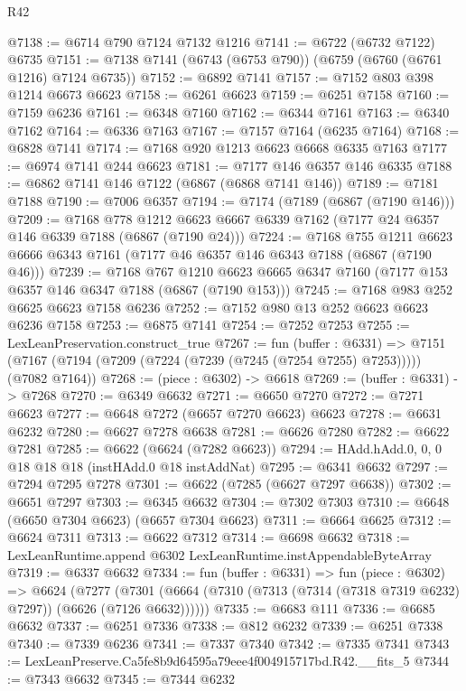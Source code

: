 \begin{lexlean}{R42}
\begin{coremodule}
{@7138 := @6714 @790 @7124 @7132 @1216
@7141 := @6722 (@6732 @7122) @6735
@7151 := @7138 @7141 (@6743 (@6753 @790)) (@6759 (@6760 (@6761 @1216) @7124 @6735))
@7152 := @6892 @7141
@7157 := @7152 @803 @398 @1214 @6673 @6623
@7158 := @6261 @6623
@7159 := @6251 @7158
@7160 := @7159 @6236
@7161 := @6348 @7160
@7162 := @6344 @7161
@7163 := @6340 @7162
@7164 := @6336 @7163
@7167 := @7157 @7164 (@6235 @7164)
@7168 := @6828 @7141
@7174 := @7168 @920 @1213 @6623 @6668 @6335 @7163
@7177 := @6974 @7141 @244 @6623
@7181 := @7177 @146 @6357 @146 @6335
@7188 := @6862 @7141 @146 @7122 (@6867 (@6868 @7141 @146))
@7189 := @7181 @7188
@7190 := @7006 @6357
@7194 := @7174 (@7189 (@6867 (@7190 @146)))
@7209 := @7168
    @778
    @1212
    @6623
    @6667
    @6339
    @7162
    (@7177 @24 @6357 @146 @6339 @7188 (@6867 (@7190 @24)))
@7224 := @7168
    @755
    @1211
    @6623
    @6666
    @6343
    @7161
    (@7177 @46 @6357 @146 @6343 @7188 (@6867 (@7190 @46)))
@7239 := @7168
    @767
    @1210
    @6623
    @6665
    @6347
    @7160
    (@7177 @153 @6357 @146 @6347 @7188 (@6867 (@7190 @153)))
@7245 := @7168 @983 @252 @6625 @6623 @7158 @6236
@7252 := @7152 @980 @13 @252 @6623 @6623 @6236 @7158
@7253 := @6875 @7141
@7254 := @7252 @7253
@7255 := LexLeanPreservation.construct_true
@7267 := fun (buffer : @6331) =>
  @7151 (@7167 (@7194 (@7209 (@7224 (@7239 (@7245 (@7254 @7255) @7253))))) (@7082 @7164))
@7268 := (piece : @6302) -> @6618
@7269 := (buffer : @6331) -> @7268
@7270 := @6349 @6632
@7271 := @6650 @7270
@7272 := @7271 @6623
@7277 := @6648 @7272 (@6657 @7270 @6623) @6623
@7278 := @6631 @6232
@7280 := @6627 @7278 @6638
@7281 := @6626 @7280
@7282 := @6622 @7281
@7285 := @6622 (@6624 (@7282 @6623))
@7294 := HAdd.hAdd.{0, 0, 0} @18 @18 @18 (instHAdd.{0} @18 instAddNat)
@7295 := @6341 @6632
@7297 := @7294 @7295 @7278
@7301 := @6622 (@7285 (@6627 @7297 @6638))
@7302 := @6651 @7297
@7303 := @6345 @6632
@7304 := @7302 @7303
@7310 := @6648 (@6650 @7304 @6623) (@6657 @7304 @6623)
@7311 := @6664 @6625
@7312 := @6624 @7311
@7313 := @6622 @7312
@7314 := @6698 @6632
@7318 := LexLeanRuntime.append @6302 LexLeanRuntime.instAppendableByteArray
@7319 := @6337 @6632
@7334 := fun (buffer : @6331) =>
  fun (piece : @6302) =>
  @6624
    (@7277 (@7301 (@6664 (@7310 (@7313 (@7314 (@7318 @7319 @6232) @7297)) (@6626 (@7126 @6632))))))
@7335 := @6683 @111
@7336 := @6685 @6632
@7337 := @6251 @7336
@7338 := @812 @6232
@7339 := @6251 @7338
@7340 := @7339 @6236
@7341 := @7337 @7340
@7342 := @7335 @7341
@7343 := LexLeanPreserve.Ca5fe8b9d64595a79eee4f004915717bd.R42.__fits_5
@7344 := @7343 @6632
@7345 := @7344 @6232
}
\end{coremodule}
\end{lexlean}
